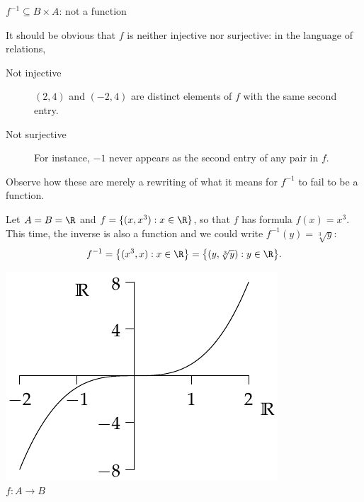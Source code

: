 \begin{examples}
\begin{center}
\begin{minipage}{0.35\textwidth}
$f^{-1}\subseteq B\times A$: not a function
\end{minipage}
\end{center}
It should be obvious that $f$ is neither injective nor surjective: in the language of relations,
\begin{description}
	\item[Not injective]\quad $(2,4)$ and $(-2,4)$ are distinct elements of $f$ with the same second entry.
	\item[Not surjective]\quad For instance, $-1$ never appears as the second entry of any pair in $f$.
\end{description}
Observe how these are merely a rewriting of what it means for $f^{-1}$ to fail to be a function.

\item\label{ex:reln2} Let $A=B=\R$ and $f=\{(x,x^3):x\in\R\}$, so that $f$ has formula $f(x)=x^3$. This time, the inverse is also a function and we could write $f^{-1}(y)=\sqrt[3]{y}$:
\[f^{-1}=\bigl\{(x^3,x):x\in\R\bigr\}=\bigl\{(y,\sqrt[3]{y}):y\in\R\bigr\}.\]
\begin{center}
\begin{minipage}{0.35\textwidth}\centering
\includegraphics[width=\textwidth]{relations-22-reln3}\\
$f:A\to B$
\end{minipage}\qquad\qquad\qquad
\begin{minipage}{0.35\textwidth}\centering

\end{minipage}
\end{center}
\end{examples}
